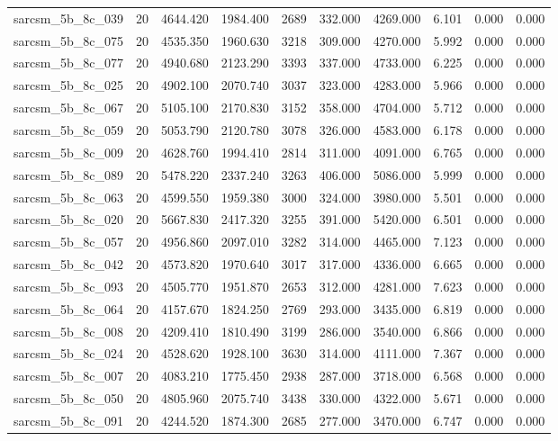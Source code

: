 \begin{tabular}{lrrrrrrrrr}
sarcsm\_5b\_8c\_039 & 20 & 4644.420 & 1984.400 & 2689 & 332.000 & 4269.000 & 6.101 & 0.000 & 0.000 \\
sarcsm\_5b\_8c\_075 & 20 & 4535.350 & 1960.630 & 3218 & 309.000 & 4270.000 & 5.992 & 0.000 & 0.000 \\
sarcsm\_5b\_8c\_077 & 20 & 4940.680 & 2123.290 & 3393 & 337.000 & 4733.000 & 6.225 & 0.000 & 0.000 \\
sarcsm\_5b\_8c\_025 & 20 & 4902.100 & 2070.740 & 3037 & 323.000 & 4283.000 & 5.966 & 0.000 & 0.000 \\
sarcsm\_5b\_8c\_067 & 20 & 5105.100 & 2170.830 & 3152 & 358.000 & 4704.000 & 5.712 & 0.000 & 0.000 \\
sarcsm\_5b\_8c\_059 & 20 & 5053.790 & 2120.780 & 3078 & 326.000 & 4583.000 & 6.178 & 0.000 & 0.000 \\
sarcsm\_5b\_8c\_009 & 20 & 4628.760 & 1994.410 & 2814 & 311.000 & 4091.000 & 6.765 & 0.000 & 0.000 \\
sarcsm\_5b\_8c\_089 & 20 & 5478.220 & 2337.240 & 3263 & 406.000 & 5086.000 & 5.999 & 0.000 & 0.000 \\
sarcsm\_5b\_8c\_063 & 20 & 4599.550 & 1959.380 & 3000 & 324.000 & 3980.000 & 5.501 & 0.000 & 0.000 \\
sarcsm\_5b\_8c\_020 & 20 & 5667.830 & 2417.320 & 3255 & 391.000 & 5420.000 & 6.501 & 0.000 & 0.000 \\
sarcsm\_5b\_8c\_057 & 20 & 4956.860 & 2097.010 & 3282 & 314.000 & 4465.000 & 7.123 & 0.000 & 0.000 \\
sarcsm\_5b\_8c\_042 & 20 & 4573.820 & 1970.640 & 3017 & 317.000 & 4336.000 & 6.665 & 0.000 & 0.000 \\
sarcsm\_5b\_8c\_093 & 20 & 4505.770 & 1951.870 & 2653 & 312.000 & 4281.000 & 7.623 & 0.000 & 0.000 \\
sarcsm\_5b\_8c\_064 & 20 & 4157.670 & 1824.250 & 2769 & 293.000 & 3435.000 & 6.819 & 0.000 & 0.000 \\
sarcsm\_5b\_8c\_008 & 20 & 4209.410 & 1810.490 & 3199 & 286.000 & 3540.000 & 6.866 & 0.000 & 0.000 \\
sarcsm\_5b\_8c\_024 & 20 & 4528.620 & 1928.100 & 3630 & 314.000 & 4111.000 & 7.367 & 0.000 & 0.000 \\
sarcsm\_5b\_8c\_007 & 20 & 4083.210 & 1775.450 & 2938 & 287.000 & 3718.000 & 6.568 & 0.000 & 0.000 \\
sarcsm\_5b\_8c\_050 & 20 & 4805.960 & 2075.740 & 3438 & 330.000 & 4322.000 & 5.671 & 0.000 & 0.000 \\
sarcsm\_5b\_8c\_091 & 20 & 4244.520 & 1874.300 & 2685 & 277.000 & 3470.000 & 6.747 & 0.000 & 0.000 \\

\end{tabular}

